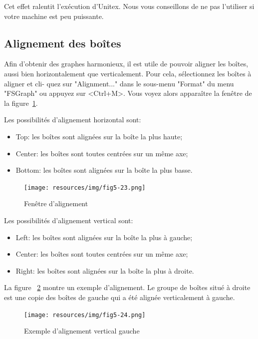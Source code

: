 \noindent Cet effet ralentit l’exécution d’Unitex. Nous vous conseillons de ne pas l’utiliser
si votre machine est peu puissante.



\subsection{Alignement des boîtes}
Afin d’obtenir des graphes harmonieux, il est utile de pouvoir aligner les boîtes, aussi
bien horizontalement que verticalement. Pour cela, sélectionnez les boîtes à aligner et cli-
quez sur "Alignment..." dans le sous-menu "Format" du menu "FSGraph" ou appuyez sur
<Ctrl+M>. Vous voyez alors apparaître la fenêtre de la figure~\ref{fig-alignment-frame}.

\bigskip
\noindent Les possibilités d’alignement horizontal sont:
\begin{itemize}
  \item Top: les boîtes sont alignées sur la boîte la plus haute;
  \item Center: les boîtes sont toutes centrées sur un même axe;
  \item Bottom: les boîtes sont alignées sur la boîte la plus basse.
\end{itemize}

\begin{figure}[!ht]
\begin{center}
\texttt{[image: resources/img/fig5-23.png]}
\caption{Fenêtre d’alignement\label{fig-alignment-frame}}
\end{center}
\end{figure}

\noindent Les possibilités d’alignement vertical sont:
\begin{itemize}
  \item Left: les boîtes sont alignées sur la boîte la plus à gauche;
  \item Center: les boîtes sont toutes centrées sur un même axe;
  \item Right: les boîtes sont alignées sur la boîte la plus à droite.
\end{itemize}

\bigskip
\noindent La figure ~\ref{fig-vertical-left-alignment} montre un exemple 
d’alignement. Le groupe de boîtes situé à droite est une copie des boîtes
de gauche qui a été alignée verticalement à gauche.


\bigskip
\begin{figure}[!ht]
\begin{center}
\texttt{[image: resources/img/fig5-24.png]}
\caption{Exemple d’alignement vertical gauche\label{fig-vertical-left-alignment}}
\end{center}
\end{figure}

